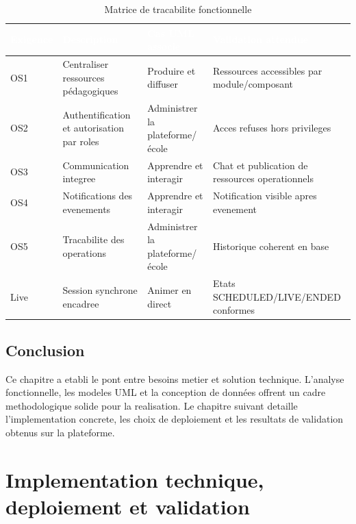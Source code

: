 \documentclass[12pt,a4paper,oneside]{report}
\begin{document}
\renewcommand{\arraystretch}{1.35}
\begin{longtable}{|p{2.2cm}|p{4.1cm}|p{3.5cm}|p{3.6cm}|}
\caption{Matrice de tracabilite fonctionnelle}\label{tab:traceabilite}\\
\hline
\rowcolor{ustoblue}
\textcolor{white}{\textbf{Exigence}} &
\textcolor{white}{\textbf{Description}} &
\textcolor{white}{\textbf{Cas UML associe}} &
\textcolor{white}{\textbf{Validation attendue}} \\
\hline
OS1 & Centraliser ressources pédagogiques & Produire et diffuser & Ressources accessibles par module/composant \\
\hline
OS2 & Authentification et autorisation par roles & Administrer la plateforme/école & Acces refuses hors privileges \\
\hline
OS3 & Communication integree & Apprendre et interagir & Chat et publication de ressources operationnels \\
\hline
OS4 & Notifications des evenements & Apprendre et interagir & Notification visible apres evenement \\
\hline
OS5 & Tracabilite des operations & Administrer la plateforme/école & Historique coherent en base \\
\hline
Live & Session synchrone encadree & Animer en direct & Etats SCHEDULED/LIVE/ENDED conformes \\
\hline
\end{longtable}

\section{Conclusion}

Ce chapitre a etabli le pont entre besoins metier et solution technique. L'analyse fonctionnelle, les modeles UML et la conception de données offrent un cadre methodologique solide pour la realisation. Le chapitre suivant detaille l'implementation concrete, les choix de deploiement et les resultats de validation obtenus sur la plateforme.


\chapter{Implementation technique, deploiement et validation}
\end{document}
